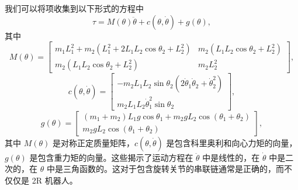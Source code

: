 \documentclass[12pt,a4paper]{article}
\begin{document}
我们可以将项收集到以下形式的方程中
\begin{equation}
\tau = M(\theta)\ddot{\theta} + c(\theta, \dot{\theta}) + g(\theta), \label{eq:8.10}
\end{equation}
其中
\begin{equation}
M(\theta) = \begin{bmatrix}
m_1 L_1^2 + m_2(L_1^2 + 2L_1 L_2 \cos \theta_2 + L_2^2) & m_2(L_1 L_2 \cos \theta_2 + L_2^2) \\
m_2(L_1 L_2 \cos \theta_2 + L_2^2) & m_2 L_2^2
\end{bmatrix},
\end{equation}
\begin{equation}
c(\theta, \dot{\theta}) = \begin{bmatrix}
-m_2 L_1 L_2 \sin \theta_2(2\dot{\theta}_1 \dot{\theta}_2 + \dot{\theta}_2^2) \\
m_2 L_1 L_2 \dot{\theta}_1^2 \sin \theta_2
\end{bmatrix},
\end{equation}
\begin{equation}
g(\theta) = \begin{bmatrix}
(m_1 + m_2)L_1 g \cos \theta_1 + m_2 g L_2 \cos(\theta_1 + \theta_2) \\
m_2 g L_2 \cos(\theta_1 + \theta_2)
\end{bmatrix},
\end{equation}
其中 $M(\theta)$ 是对称正定质量矩阵，$c(\theta, \dot{\theta})$ 是包含科里奥利和向心力矩的向量，$g(\theta)$ 是包含重力矩的向量。这些揭示了运动方程在 $\ddot{\theta}$ 中是线性的，在 $\dot{\theta}$ 中是二次的，在 $\theta$ 中是三角函数的。这对于包含旋转关节的串联链通常是正确的，而不仅仅是 2R 机器人。
\end{document}
